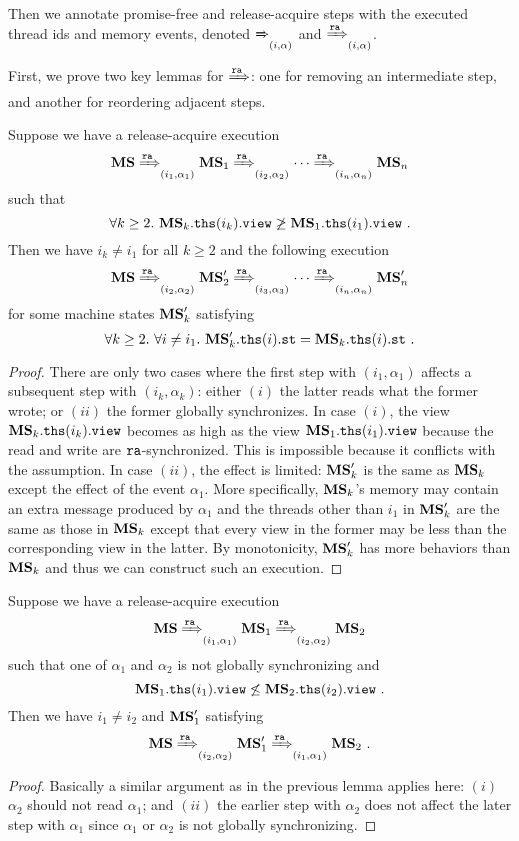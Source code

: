 Then we annotate promise-free and release-acquire steps with 
the executed thread ids and memory events, denoted $\xRightarrow{}_{(i,\alpha)}$ and $\xRightarrow{\texttt{ra}}_{(i,\alpha)}$.

First, we prove two key lemmas for $\xRightarrow{\texttt{ra}}$: one for removing an
intermediate step, and another for reordering adjacent steps.
\begin{lemma}
\label{lem:drf-key-remove}
Suppose we have a release-acquire execution 
\[{\mathbf{MS}} \xRightarrow{\texttt{ra}}_{(i_1,\alpha_1)} {\mathbf{MS}}_1 \xRightarrow{\texttt{ra}}_{(i_2,\alpha_2)}
\cdots \xRightarrow{\texttt{ra}}_{(i_n,\alpha_n)} {\mathbf{MS}}_n \]
such that
\[
\forall k \ge 2.~ {\mathbf{MS}}_k.\mathtt{ths}(i_k).\texttt{view}  \not\geq {\mathbf{MS}}_1.\mathtt{ths}(i_1).\texttt{view} ~.
\]
Then we have $i_k \neq i_1$ for all $k \ge 2$ and the following execution
\[
{\mathbf{MS}} \xRightarrow{\texttt{ra}}_{(i_2,\alpha_2)} {\mathbf{MS}}'_2 \xRightarrow{\texttt{ra}}_{(i_3,\alpha_3)}
\cdots \xRightarrow{\texttt{ra}}_{(i_n,\alpha_n)} {\mathbf{MS}}'_n
\]
for some machine states ${\mathbf{MS}}'_k$ satisfying
\[
\forall k\ge 2.~\forall i \neq i_1.~ {\mathbf{MS}}'_k.\mathtt{ths}(i).\texttt{st} = {\mathbf{MS}}_k.\mathtt{ths}(i).\texttt{st}~.
\]
\end{lemma}
\begin{proof}
There are only two cases where the first step with
$(i_1,\alpha_1)$ affects a subsequent step with $(i_k,\alpha_k)$:
either $(i)$ the latter reads what the former wrote; or $(ii)$ the
former globally synchronizes.  In case $(i)$, the view
${\mathbf{MS}}_k.\mathtt{ths}(i_k).\texttt{view}$ becomes as high as the view
${\mathbf{MS}}_1.\mathtt{ths}(i_1).\texttt{view}$ because the read and write are
$\texttt{ra}$-synchronized. This is impossible because it conflicts with the
assumption.  In case $(ii)$, the effect is limited: ${\mathbf{MS}}'_k$ is the
same as ${\mathbf{MS}}_k$ except the effect of the event $\alpha_1$.  More
specifically, ${\mathbf{MS}}_k$'s memory may contain an extra message
produced by $\alpha_1$ and the threads other than $i_1$ in ${\mathbf{MS}}'_k$
are the same as those in ${\mathbf{MS}}_k$ except that every view in the
former may be less than the corresponding view in the latter.  By
monotonicity, ${\mathbf{MS}}'_k$ has more behaviors than ${\mathbf{MS}}_k$ and thus
we can construct such an execution.
\end{proof}

\begin{lemma}
\label{lem:drf-key-reorder}
Suppose we have a release-acquire execution 
\[{\mathbf{MS}} \xRightarrow{\texttt{ra}}_{(i_1,\alpha_1)} {\mathbf{MS}}_1 \xRightarrow{\texttt{ra}}_{(i_2,\alpha_2)} {\mathbf{MS}}_2 \]
such that one of $\alpha_1$ and $\alpha_2$ is not globally synchronizing and
\[
{\mathbf{MS}}_1.\mathtt{ths}(i_1).\texttt{view} \not\leq {\mathbf{MS}}_2.\mathtt{ths}(i_2).\texttt{view} ~.
\]
Then we have $i_1 \neq i_2$ and ${\mathbf{MS}}_1'$ satisfying
\[
{\mathbf{MS}} \xRightarrow{\texttt{ra}}_{(i_2,\alpha_2)} {\mathbf{MS}}'_1 \xRightarrow{\texttt{ra}}_{(i_1,\alpha_1)} {\mathbf{MS}}_2 ~.
\]
\end{lemma}
\begin{proof}
Basically a similar argument as in the previous lemma applies here:
$(i)$ $\alpha_2$ should not read $\alpha_1$; and $(ii)$ the earlier
step with $\alpha_2$ does not affect the later step with
$\alpha_1$ since $\alpha_1$ or $\alpha_2$ is not globally synchronizing.
\end{proof}

